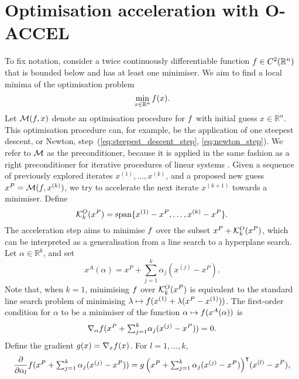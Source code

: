 \documentclass[main.tex]{subfiles}
\begin{document}
\section{Optimisation acceleration with O-ACCEL}\label{sec:algo_description}
To fix notation, consider a twice continuously differentiable function
$f\in C^2(\mathbb{R}^n)$ that is bounded below and has at least one
minimiser.  We aim to find a local minima of the optimisation problem
\begin{equation}
  \min_{x\in\mathbb{R}^n}f(x).
\end{equation}
Let $\mathcal{M}(f,x)$ denote an optimisation procedure for $f$ with
initial guess $x\in\mathbb{R}^n$. This optimisation procedure can, for
example, be the application of one steepest descent, or Newton,
step~(\ref{eq:steepest_descent_step}, \ref{eq:newton_step}). We  refer to
$\mathcal{M}$ as the preconditioner, because it is
applied in the same fashion as a right preconditioner for iterative
procedures of linear systems \citep{brune2015composing}.  Given a
sequence of previously explored iterates $x^{(1)},\dots,x^{(k)}$, and
a proposed new guess $x^P = \mathcal{M}(f,x^{(k)})$, we try to
accelerate the next iterate $x^{(k+1)}$ towards a minimiser.  Define
\begin{equation}
  \mathcal{K}_{k}^O(x^P)=\mbox{span}\{x^{(1)}-x^P,\dots,x^{(k)}-x^P\}.
\end{equation}
The acceleration step aims to minimise $f$ over the subset
$x^P+\mathcal{K}_{k}^O(x^P)$, which can be interpreted as a generalisation
from a line search to a hyperplane search.  Let
$\alpha\in \mathbb{R}^k$, and set
\begin{equation}\label{eq:def_xA}
  x^A(\alpha) = x^P + \sum_{j=1}^k\alpha_j(x^{(j)}-x^P).
\end{equation}
Note that, when $k=1$, minimising $f$ over $\mathcal{K}_{k}^O(x^P)$ is
equivalent to the standard line search problem of minimising
$\lambda \mapsto f(x^{(1)}+\lambda (x^P-x^{(1)}))$.  The
first-order condition for $\alpha$ to be a minimiser of the function
$\alpha\mapsto f(x^A(\alpha))$ is
\begin{equation}
  \nabla_{\alpha} f(x^P+{\textstyle\sum_{j=1}^k}\alpha_j(x^{(j)}-x^P)) =0.
\end{equation}
Define the gradient $g(x)=\nabla_xf(x)$. For $l=1,\dots,k$,
\begin{equation}\label{eq:deriv_objective_alpha}
  \frac{\partial }{\partial \alpha_l}
  f({\textstyle x^P+\sum_{j=1}^k\alpha_j(x^{(j)}-x^P)})
  = {g\left({\textstyle x^P+\sum_{j=1}^k\alpha_j(x^{(j)}-x^P)}\right)}^\intercal
  (x^{(l)}-x^P),
\end{equation}
\end{document}

